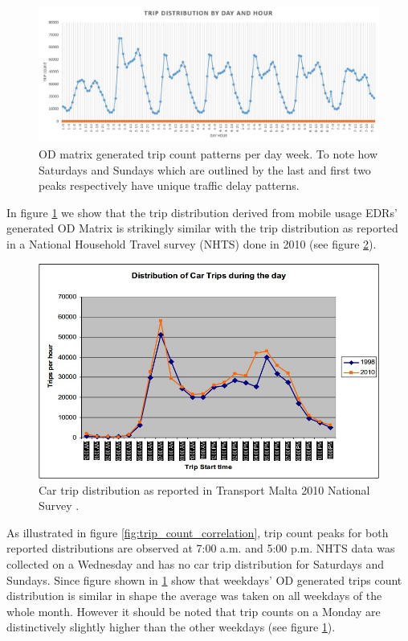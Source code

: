 \documentclass[12pt, a4paper]{report}
\theoremstyle{definition}
\theoremstyle{definition}%
\theoremstyle{definition}%
\theoremstyle{definition}%
\theoremstyle{definition}%
\theoremstyle{definition}%
\begin{document}
\begin{figure}[!]	
	\includegraphics[scale=0.5]{Trip_delay_per_day_week.jpg}
	\centering
	\caption[OD matrix generated trip count]{OD matrix generated trip count patterns per day week. To note how Saturdays and Sundays which are outlined by the last and first two peaks respectively have unique traffic delay patterns.}
	\label{fig:trip_distribution}
\end{figure}


In figure \ref{fig:trip_distribution} we show that the trip distribution derived from mobile usage EDRs' generated OD Matrix is strikingly similar with the trip distribution as reported in a National Household Travel survey (NHTS) done in 2010 \cite{malta2011national} (see figure \ref{fig:trip_distribution_nso}). 


\begin{figure}[!]	
	\includegraphics[scale=0.6]{Transport_malta_trip_distribution.jpg}
	\centering
	\caption[NHTS car trip distribution]{Car trip distribution as reported in Transport Malta 2010 National Survey \cite{malta2011national}.}
	\label{fig:trip_distribution_nso}
\end{figure}

As illustrated in figure \ref{fig:trip_count_correlation}, trip count peaks for both reported distributions are observed at 7:00 a.m. and 5:00 p.m. NHTS data was collected on a Wednesday and has no car trip distribution for Saturdays and Sundays. Since figure shown in \ref{fig:trip_distribution} show that weekdays' OD generated trips count distribution is similar in shape the average was taken on all weekdays of the whole month. However it should be noted that trip counts on a Monday are distinctively slightly higher than the other weekdays (see figure \ref{fig:trip_distribution}). 
\end{document}

